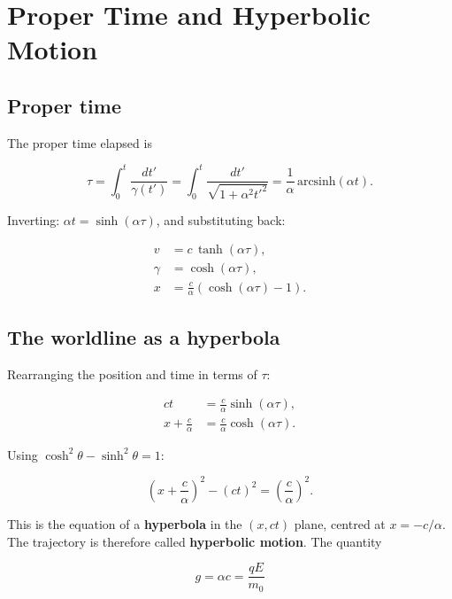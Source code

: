 \section{Proper Time and Hyperbolic Motion}

\subsection{Proper time}

The proper time elapsed is

\begin{equation}
\tau = \int_0^t \frac{dt'}{\gamma(t')} = \int_0^t \frac{dt'}{\sqrt{1 + \alpha^2 t'^2}} = \frac{1}{\alpha}\,\text{arcsinh}(\alpha t).
\end{equation}

Inverting: $\alpha t = \sinh(\alpha\tau)$, and substituting back:

\begin{align}
v &= c\,\tanh(\alpha\tau), \\
\gamma &= \cosh(\alpha\tau), \\
x &= \frac{c}{\alpha}\!\left(\cosh(\alpha\tau) - 1\right).
\end{align}

\subsection{The worldline as a hyperbola}

Rearranging the position and time in terms of $\tau$:

\begin{align}
ct &= \frac{c}{\alpha}\sinh(\alpha\tau), \\
x + \frac{c}{\alpha} &= \frac{c}{\alpha}\cosh(\alpha\tau).
\end{align}

Using $\cosh^2\theta - \sinh^2\theta = 1$:

\begin{equation}
\boxed{\left(x + \frac{c}{\alpha}\right)^2 - (ct)^2 = \left(\frac{c}{\alpha}\right)^2.}
\end{equation}

This is the equation of a \textbf{hyperbola} in the $(x, ct)$ plane, centred at $x = -c/\alpha$. The trajectory is therefore called \textbf{hyperbolic motion}. The quantity

\begin{equation}
g = \alpha c = \frac{qE}{m_0}
\end{equation}

